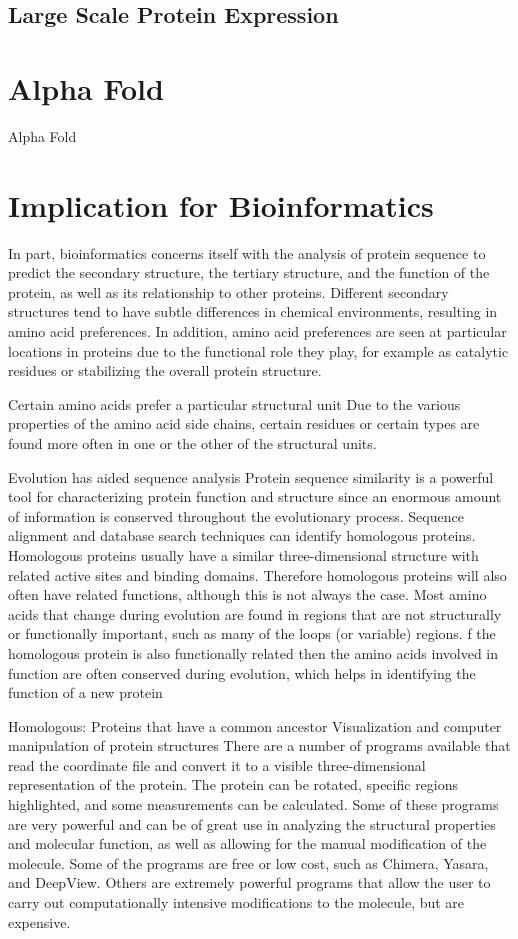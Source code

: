 \documentclass{article}
\begin{document}
\subsection{Large Scale Protein Expression}

\section{Alpha Fold}

Alpha Fold

\section{Implication for Bioinformatics}

In part, bioinformatics concerns itself with the analysis of protein sequence to predict the secondary structure, the tertiary structure, and the function of the protein, as well as its relationship to other proteins. Different secondary structures tend to have subtle differences in chemical environments, resulting in amino acid preferences. In addition, amino acid preferences are seen at particular locations in proteins due to the functional role they play, for example as catalytic residues or stabilizing the overall protein structure.


Certain amino acids prefer a particular structural unit
Due to the various properties of the amino acid side chains, certain residues or certain types are found more often in one or the other of the structural units.


Evolution has aided sequence analysis
Protein sequence similarity is a powerful tool for characterizing protein function and structure since an enormous amount of information is conserved throughout the evolutionary process. Sequence alignment and database search techniques can identify homologous proteins. Homologous proteins usually have a similar three-dimensional structure with related active sites and binding domains. Therefore homologous proteins will also often have related functions, although this is not always the case. Most amino acids that change during evolution are found in regions that are not structurally or functionally important, such as many of the loops (or variable) regions. f the homologous protein is also functionally related then the amino acids involved in function are often conserved during evolution, which helps in identifying the function of a new protein

Homologous: Proteins that have a common ancestor 
Visualization and computer manipulation of protein structures
There are a number of programs available that read the coordinate file and convert it to a visible three-dimensional representation of the protein. The protein can be rotated, specific regions highlighted, and some measurements can be calculated. Some of these programs are very powerful and can be of great use in analyzing the structural properties and molecular function, as well as allowing for the manual modification of the molecule. Some of the programs are free or low cost, such as Chimera, Yasara, and DeepView. Others are extremely powerful programs that allow the user to carry out computationally intensive modifications to the molecule, but are expensive.




\end{document}
